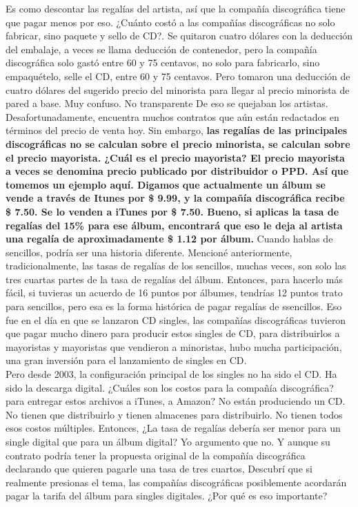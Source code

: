 \documentclass[10pt]{book}
\begin{document}
Es como descontar las regalías del artista, así que  la compañía discográfica tiene que pagar menos por eso. ¿Cuánto costó a las compañías discográficas no solo fabricar, sino paquete y sello de CD?. Se quitaron cuatro dólares con la deducción del embalaje, a veces se llama deducción de contenedor, pero la compañía discográfica solo gastó entre 60 y 75 centavos, no solo para fabricarlo, sino empaquételo, selle el CD, entre 60 y 75 centavos. Pero tomaron una deducción de cuatro dólares del sugerido precio del minorista para llegar al precio minorista de pared a base. Muy confuso. No transparente De eso se quejaban los artistas. Desafortunadamente, encuentra muchos contratos que aún están redactados en términos del precio de venta hoy. Sin embargo, \textbf{las regalías de las principales discográficas no se calculan sobre el precio minorista, se calculan sobre el precio mayorista. ¿Cuál es el precio mayorista? El precio mayorista a veces se denomina precio publicado por distribuidor o PPD. Así que tomemos un ejemplo aquí. Digamos que actualmente un álbum se vende a través de Itunes por \$ 9.99, y la compañía discográfica recibe \$ 7.50. Se lo venden a iTunes por \$ 7.50. Bueno, si aplicas la tasa de regalías del 15\% para ese álbum, encontrará que eso le deja al artista una regalía de aproximadamente \$ 1.12 por álbum.} Cuando hablas de sencillos, podría ser una historia diferente. Mencioné anteriormente, tradicionalmente, las tasas de regalías de los sencillos, muchas veces, son solo las tres cuartas partes de la tasa de regalías del álbum. Entonces, para hacerlo más fácil, si tuvieras un acuerdo de 16 puntos por álbumes, tendrías 12 puntos trato para sencillos, pero esa es la forma histórica de pagar regalías de ssencillos. Eso fue en el día en que se lanzaron CD singles, las compañías discográficas tuvieron que pagar mucho dinero para producir estos singles de CD, para distribuirlos a mayoristas y mayoristas que vendieron a minoristas, hubo mucha participación, una gran inversión para el lanzamiento de singles en CD.\\
Pero desde 2003, la configuración principal de los singles no ha sido el CD. Ha sido la descarga digital. ¿Cuáles son los costos para la compañía discográfica? para entregar estos archivos a iTunes, a Amazon? No están produciendo un CD. No tienen que distribuirlo y tienen almacenes para distribuirlo. No tienen todos esos costos múltiples. Entonces, ¿La tasa de regalías debería ser menor para un single digital que para un álbum digital? Yo argumento que no. Y aunque su contrato podría tener la propuesta original de la compañía discográfica declarando que quieren pagarle una tasa de tres cuartos, Descubrí que si realmente presionas el tema, las compañías discográficas posiblemente acordarán pagar la tarifa del álbum para singles digitales. ¿Por qué es eso importante?\\
\end{document}
